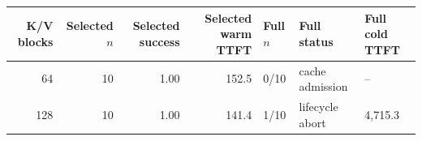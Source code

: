 \begin{tabular}{rrrrlll}
\toprule
K/V blocks & Selected $n$ & Selected success & Selected warm TTFT & Full $n$ & Full status & Full cold TTFT \\
\midrule
64 & 10 & 1.00 & 152.5 & 0/10 & cache admission & -- \\
128 & 10 & 1.00 & 141.4 & 1/10 & lifecycle abort & 4,715.3 \\
\bottomrule
\end{tabular}
